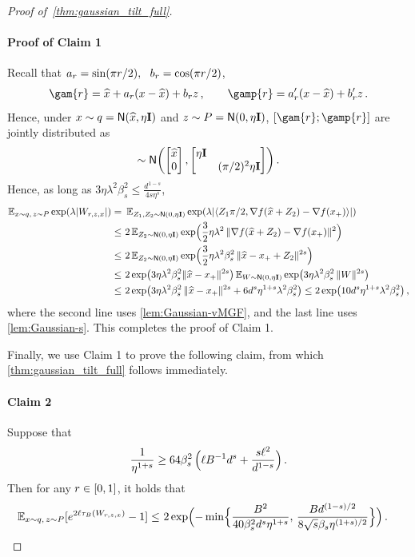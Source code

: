\begin{proof}[Proof of~\cref{thm:gaussian_tilt_full}]
\paragraph{Proof of Claim 1}
Recall that $\alr=\sin(\pi\lr/2), ~~\blr=\cos(\pi\lr/2)$, 
\begin{align*}
    \gam{\lr}=\xhat+\alr (x-\xhat) + \blr z\,, \qquad
    \gamp{\lr}=\alrp (x -\xhat) + \blrp z\,.
\end{align*}
Hence, under $x\sim q=\normal{\xhat,\eta\Id}$ and $z\sim P=\normal{0,\eta\Id}$, $[\gam{\lr};\gamp{\lr}]$ are jointly distributed as
\begin{align*}
    [\gam{\lr};\gamp{\lr}]\sim \normal{\begin{bmatrix} \xhat \\ 0 \end{bmatrix}, \begin{bmatrix} \eta\Id &  \\ & (\pi/2)^2\eta\Id \end{bmatrix}
    }\,.
\end{align*}
Hence, as long as $3\eta\lambda^2\beta_s^2\leq \frac{d^{1-s}}{4s\eta^s}$,
\begin{align*}
    \En_{x\sim q,\,z\sim P}\exp\prn*{\lambda \abs{W_{r,z,x}}}
    =&~\En_{Z_1,Z_2\sim \normal{0,\eta\Id}}\exp\prn*{\lambda\abs{\tri{Z_1\pi/2, \nabla f(\xhat+Z_2)-\nabla f(\xp)}}} \\
    \leq&~ 2\En_{Z_2\sim \normal{0,\eta\Id}}\exp\prn[\Big]{\frac{3}{2}\eta\lambda^2\,\nrm{\nabla f(\xhat+Z_2)-\nabla f(\xp)}^2} \\
    \leq&~ 2\En_{Z_2\sim \normal{0,\eta\Id}}\exp\prn[\Big]{\frac{3}{2}\eta\lambda^2\beta_s^2\,\nrm{\xhat-\xp+Z_2}^{2s}} \\
    \leq&~ 2\exp\prn*{3\eta\lambda^2\beta_s^2\nrm{\xhat-\xp}^{2s}}\En_{W\sim \normal{0,\eta\Id}}\exp\prn*{3\eta\lambda^2\beta_s^2\,\nrm{W}^{2s}} \\
    \leq&~ 2\exp\prn[\big]{3\eta\lambda^2\beta_s^2\,\nrm{\xhat-\xp}^{2s}+6d^s\eta^{1+s}\lambda^2\beta_s^2}
    \leq 2\exp\prn[\big]{10d^s\eta^{1+s}\lambda^2\beta_s^2}\,,
\end{align*}
where the second line uses \cref{lem:Gaussian-vMGF}, and the last line uses \cref{lem:Gaussian-s}. This completes the proof of Claim 1.%

Finally, we use Claim 1 to prove the following claim, from which \cref{thm:gaussian_tilt_full} follows immediately.

\paragraph{Claim 2}
Suppose that 
\begin{align*}
    \frac{1}{\eta^{1+s}}\geq 64\beta_s^2\,\prn[\Big]{\ell B^{-1} d^s+\frac{s\ell^2}{d^{1-s}}}\,.
\end{align*}
Then for any $\lr\in[0,1]$, it holds that
\begin{align*}
    \En_{x\sim q,\, z\sim P}\brk{e^{2\ell\trunc{W_{r,z,x}}}-1}
    \leq&~ 2\exp\prn[\Big]{-\min\crl[\Big]{\frac{\B^2}{40\beta_s^2d^s\eta^{1+s}},\, \frac{Bd^{(1-s)/2}}{8\sqrt{s}\beta_s\eta^{(1+s)/2}}}}\,.
\end{align*}


\end{proof}
